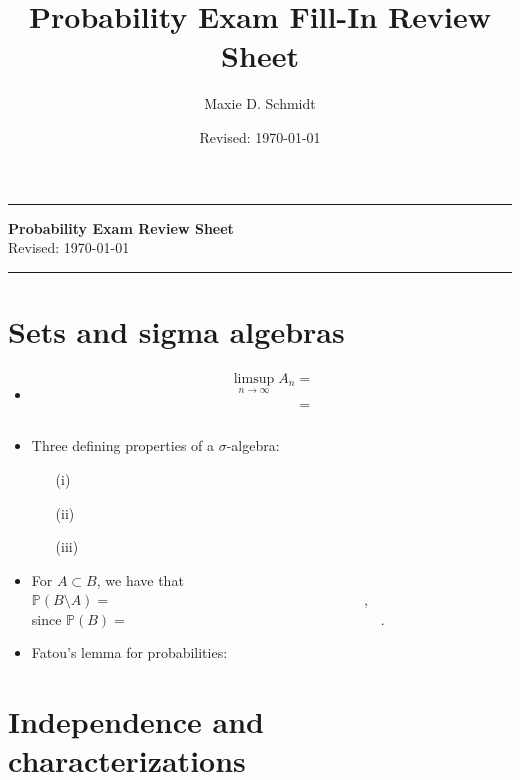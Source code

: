 \documentclass[12pt,reqno]{article}
\title{Probability Exam Fill-In Review Sheet}
\author{Maxie D. Schmidt}
\date{Revised: \today}
\theoremstyle{plain}
\theoremstyle{definition}
\newcommand{\PP}[1]{\ensuremath{\mathbb{P}\left(#1\right)}}
\begin{document}
\vskip -0.45in
\noindent 
\rule{\textwidth}{0.1cm} 

\begin{center} 
{\normalfont\sffamily\Large\bf Probability Exam Review Sheet} \\[0.25cm]  
{\normalfont\sffamily\large Revised: \today}
\end{center}

\noindent 
\rule{\textwidth}{0.1cm} 

\section{Sets and sigma algebras}

\begin{itemize} 

\item \begin{align*} & \limsup_{n \rightarrow \infty} A_n =&  \\ & \phantom{\limsup_{n \rightarrow \infty} A_n} =& \end{align*} 
\item Three defining properties of a $\sigma$-algebra:
      \begin{itemize} 
      \item[(i)]
      \item[(ii)] 
      \item[(iii)] 
      \end{itemize} 
\item For $A \subset B$, we have that $\PP{B \setminus A} = \hspace{3in}$, \\ 
      since $\PP{B} = \hspace{3in}$. 
\item Fatou's lemma for probabilities: 

\end{itemize} 

\section{Independence and characterizations} 
\end{document}
